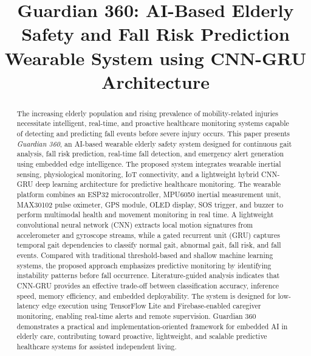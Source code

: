 \documentclass[conference]{IEEEtran}
\begin{document}
\title{Guardian 360: AI-Based Elderly Safety and Fall Risk Prediction Wearable System using CNN-GRU Architecture}

\author{
}

\maketitle

\begin{abstract}
The increasing elderly population and rising prevalence of mobility-related injuries necessitate intelligent, real-time, and proactive healthcare monitoring systems capable of detecting and predicting fall events before severe injury occurs. This paper presents \textit{Guardian 360}, an AI-based wearable elderly safety system designed for continuous gait analysis, fall risk prediction, real-time fall detection, and emergency alert generation using embedded edge intelligence. The proposed system integrates wearable inertial sensing, physiological monitoring, IoT connectivity, and a lightweight hybrid CNN-GRU deep learning architecture for predictive healthcare monitoring. The wearable platform combines an ESP32 microcontroller, MPU6050 inertial measurement unit, MAX30102 pulse oximeter, GPS module, OLED display, SOS trigger, and buzzer to perform multimodal health and movement monitoring in real time. A lightweight convolutional neural network (CNN) extracts local motion signatures from accelerometer and gyroscope streams, while a gated recurrent unit (GRU) captures temporal gait dependencies to classify normal gait, abnormal gait, fall risk, and fall events. Compared with traditional threshold-based and shallow machine learning systems, the proposed approach emphasizes predictive monitoring by identifying instability patterns before fall occurrence. Literature-guided analysis indicates that CNN-GRU provides an effective trade-off between classification accuracy, inference speed, memory efficiency, and embedded deployability. The system is designed for low-latency edge execution using TensorFlow Lite and Firebase-enabled caregiver monitoring, enabling real-time alerts and remote supervision. Guardian 360 demonstrates a practical and implementation-oriented framework for embedded AI in elderly care, contributing toward proactive, lightweight, and scalable predictive healthcare systems for assisted independent living.
\end{abstract}
\end{document}
